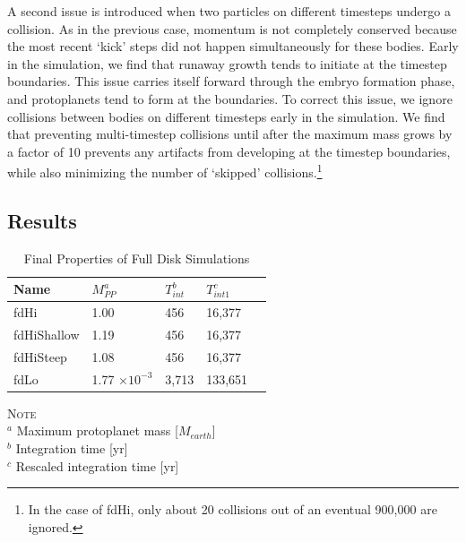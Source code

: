 \documentclass[twocolumn]{aastex63}
\begin{document}
A second issue is introduced when two particles on different timesteps
undergo a collision. As in the previous case, momentum is not
completely conserved because the most recent `kick' steps did not
happen simultaneously for these bodies. Early in the simulation, we
find that runaway growth tends to initiate at the timestep
boundaries. This issue carries itself forward through the embryo
formation phase, and protoplanets tend to form at the boundaries. To
correct this issue, we ignore collisions between bodies on different
timesteps early in the simulation. We find that preventing
multi-timestep collisions until after the maximum mass grows by a
factor of 10 prevents any artifacts from developing at the timestep
boundaries, while also minimizing the number of `skipped' collisions.\footnote{In the case of fdHi, only about 20 collisions out of an eventual 900,000 are ignored.} 

\subsection{Results}

\begin{table}
\caption{Final Properties of Full Disk Simulations}
\begin{tabular}{lllll} \hline \hline
Name     & $M_{PP}^a$ & $T_{int}^b$ & $T_{int 1}^c$ &  \\ \hline
fdHi                 &  1.00                                                         & 456                              & 16,377  &  \\
fdHiShallow    &  1.19                                                        & 456                              & 16,377  &  \\
fdHiSteep       &  1.08                                                         & 456                              & 16,377 &  \\
fdLo                &  1.77 $\times 10^{-3}$                                  & 3,713                              & 133,651 &  \\ \hline
\end{tabular}
\label{tab:sim_properties}
\begin{flushleft}
\textsc{Note} \\ {$^a$ Maximum protoplanet mass [$M_{earth}$] \\
		       $^b$ Integration time [yr] \\
		       $^c$ Rescaled integration time [yr]} \\
\end{flushleft}
\end{table}
\end{document}
